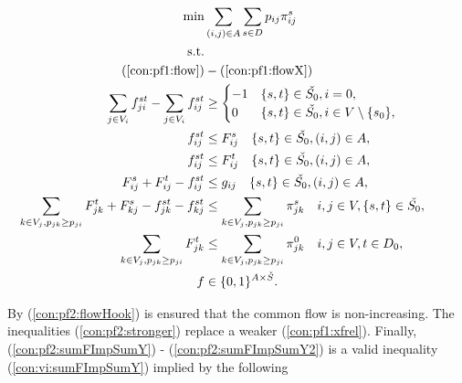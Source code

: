 \begin{subequations}[resume]
\begin{align}
\notag\min & \sum\limits_{(i,j) \in A} \sum\limits_{s \in D} p_{ij} \pi^s_{ij}\\ \notag
\text{s.t.}& && \\
\notag(\ref{con:pf1:flow}) &- (\ref{con:pf1:flowX})\\
\label{con:pf2:flowHook} \sum\limits_{\substack{ j \in V_i }}f^{st}_{ji}-\sum\limits_{\substack{j\in V_i}}f^{st}_{ij} & \geq 
  \begin{cases}
    -1 & \{s,t\}\in \check{S_0}, i = 0, \\
    0  & \{s,t\}\in \check{S_0}, i\in V\setminus \{s_0\},
  \end{cases}  \\
\label{con:pf2:startInSource}  f^{st}_{ij} & \leq F^s_{ij} \quad \{s,t\}\in \check{S_0}, (i,j)\in A,\\
\label{con:pf2:stopInDest}  f^{st}_{ij} & \leq F^t_{ij} \quad \{s,t\}\in \check{S_0}, (i,j)\in A,\\
\label{con:pf2:stronger}  F^{s}_{ij}+F^{t}_{ij}-f^{st}_{ij} &\leq g_{ij} \quad \{s,t\}\in \check{S_0}, (i,j)\in A,\\ 
\label{con:pf2:sumFImpSumY} \sum\limits_{k\in V_j, p_{jk}\geq p_{ji}}F^{t}_{jk} + F^{s}_{kj} - f^{st}_{jk} - f^{st}_{kj} & \leq \sum\limits_{k\in V_j, p_{jk}\geq p_{ji}}  \pi^{s}_{jk} \quad i,j\in V,\{s,t\}\in \check{S_0},\\
\label{con:pf2:sumFImpSumY2} \sum\limits_{k\in V_j, p_{jk}\geq p_{ji}}F^{t}_{jk} & \leq \sum\limits_{k\in V_j, p_{jk}\geq p_{ji}}  \pi^{0}_{jk} \quad i,j\in V, t\in D_0,\\
\label{con:pf2:dim} f&\in\{0,1\}^{A\times \check{S}}.
\end{align}~
\end{subequations}

By (\ref{con:pf2:flowHook}) is ensured that the common flow is non-increasing.
The inequalities (\ref{con:pf2:stronger}) replace a weaker (\ref{con:pf1:xfrel}).
Finally, (\ref{con:pf2:sumFImpSumY}) - (\ref{con:pf2:sumFImpSumY2}) is a valid inequality (\ref{con:vi:sumFImpSumY}) implied by the following

